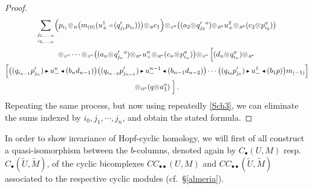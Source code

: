 \documentclass[reqno, a4paper, 10pt]{amsart}
\numberwithin{equation}{section}
\theoremstyle{plain}
\theoremstyle{definition}
\theoremstyle{remark}
\begin{document}
\begin{proof}
\begin{multline*}
 \underset{\underset{i_{0,\ldots,n}}{ j_{1,\ldots,n}}}{\sum} \Big( p_{i_1}{\otimes_{\scriptscriptstyle{{R}}}} {\big( {m_{(0)}(u_{+}^1 {{\,\raise1pt\hbox{$\scriptscriptstyle{\lhd}$} \, }} (q_{j_1}'p_{i_0}))} \big)}{\otimes_{\scriptscriptstyle{{R}}}}c_1\Big){\otimes_{\scriptscriptstyle{{S^{{{o}}}}}}}{\big( {(a_2{\otimes_{\scriptscriptstyle{{}}}}q_{j_2}'{}^o){\otimes_{\scriptscriptstyle{{\scriptscriptstyle{{R^{\rm e}}}}}}}u^2_{+}{\otimes_{\scriptscriptstyle{{\scriptscriptstyle{{R^{\rm e}}}}}}}(c_2{\otimes_{\scriptscriptstyle{{}}}}p_{i_2}^o)} \big)} \\ {\otimes_{\scriptscriptstyle{{S^{{{o}}}}}}} \cdots {\otimes_{\scriptscriptstyle{{S^{{{o}}}}}}}{\big( {(a_{n}{\otimes_{\scriptscriptstyle{{}}}}q_{j_{n}}'{}^o){\otimes_{\scriptscriptstyle{{\scriptscriptstyle{{R^{\rm e}}}}}}}u^{n}_{+}{\otimes_{\scriptscriptstyle{{\scriptscriptstyle{{R^{\rm e}}}}}}}(c_{n}{\otimes_{\scriptscriptstyle{{}}}}p_{i_n}^o)} \big)}  {\otimes_{\scriptscriptstyle{{S^{{{o}}}}}}} \left[\underset{}{} (d_{n}{\otimes_{\scriptscriptstyle{{}}}}q_{i_n}^o){\otimes_{\scriptscriptstyle{{\scriptscriptstyle{{R^{\rm e}}}}}}} \right. \\ \Big[ {\big( {(q_{i_{n-1}}p'_{j_n}){{\,\raise1pt\hbox{$\scriptscriptstyle{\blacktriangleright}$} \, }} u^{n}_{-} {{\,\raise1pt\hbox{$\scriptscriptstyle{\blacktriangleleft}$} \, }} (b_nd_{n-1})} \big)} {\big( {(q_{i_{n-2}}p'_{j_{n-1}}){{\,\raise1pt\hbox{$\scriptscriptstyle{\blacktriangleright}$} \, }} u^{n-1}_{-} {{\,\raise1pt\hbox{$\scriptscriptstyle{\blacktriangleleft}$} \, }} (b_{n-1}d_{n-2})} \big)} \cdots {\big( {(q_{i_{0}}p'_{j_{1}}){{\,\raise1pt\hbox{$\scriptscriptstyle{\blacktriangleright}$} \, }} u^{1}_{-} {{\,\raise1pt\hbox{$\scriptscriptstyle{\blacktriangleleft}$} \, }} (b_{1}p)} \big)}m_{(-1)} \Big] \\ {\otimes_{\scriptscriptstyle{{\scriptscriptstyle{{R^{\rm e}}}}}}}   
(q{\otimes_{\scriptscriptstyle{{}}}}a_1^o) \left. \underset{}{} \right].
\end{multline*}
Repeating the same process, but now using repeatedly \eqref{Sch3}, we can eliminate the sums indexed by $i_0,j_1,\cdots,j_n$, and obtain the stated formula. 
\end{proof}

In order to show invariance of Hopf-cyclic homology, we will first of all construct a quasi-isomorphism between the $b$-columns, 
denoted again by $C_{{\scriptscriptstyle{\bullet}}}(U,M)$ resp.\ $C_{{\scriptscriptstyle{\bullet}}}({\tilde{{U}}},{\tilde{{M}}})$, 
of the cyclic bicomplexes $CC_{{{\scriptscriptstyle{\bullet}}}{{\scriptscriptstyle{\bullet}}}}(U,M)$ and $CC_{{{\scriptscriptstyle{\bullet}}}{{\scriptscriptstyle{\bullet}}}}({\tilde{{U}}},{\tilde{{M}}})$ associated to the respective cyclic modules (cf.\ \S\ref{almeria}).
\end{document}
